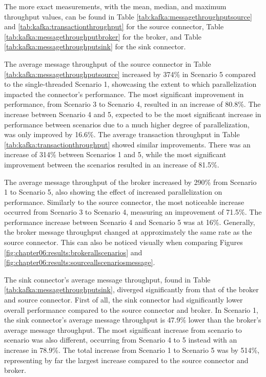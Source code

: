 The more exact measurements, with the mean, median, and maximum throughput values, can be found in Table \ref{tab:kafka:messagethroughputsource} and \ref{tab:kafka:transactionthroughput} for the source connector, Table \ref{tab:kafka:messagethroughputbroker} for the broker, and Table \ref{tab:kafka:messagethroughputsink} for the sink connector.

The average message throughput of the source connector in Table \ref{tab:kafka:messagethroughputsource} increased by 374\% in Scenario 5 compared to the single-threaded Scenario 1, showcasing the extent to which parallelization impacted the connector's performance. The most significant improvement in performance, from Scenario 3 to Scenario 4, resulted in an increase of 80.8\%. The increase between Scenario 4 and 5, expected to be the most significant increase in performance between scenarios due to a much higher degree of parallelization, was only improved by 16.6\%. The average transaction throughput in Table \ref{tab:kafka:transactionthroughput} showed similar improvements. There was an increase of 314\% between Scenarios 1 and 5, while the most significant improvement between the scenarios resulted in an increase of 81.5\%.

The average message throughput of the broker increased by 290\% from Scenario 1 to Scenario 5, also showing the effect of increased parallelization on performance. Similarly to the source connector, the most noticeable increase occurred from Scenario 3 to Scenario 4, measuring an improvement of 71.5\%. The performance increase between Scenario 4 and Scenario 5 was at 16\%. Generally, the broker message throughput changed at approximately the same rate as the source connector. This can also be noticed visually when comparing Figures \ref{fig:chapter06:results:brokerallscenarios} and \ref{fig:chapter06:results:sourceallscenariosmessage}.

The sink connector's average message throughput, found in Table \ref{tab:kafka:messagethroughputsink}, diverged significantly from that of the broker and source connector. First of all, the sink connector had significantly lower overall performance compared to the source connector and broker. In Scenario 1, the sink connector's average message throughput is 47.9\% lower than the broker's average message throughput. The most significant increase from scenario to scenario was also different, occurring from Scenario 4 to 5 instead with an increase in 78.9\%. The total increase from Scenario 1 to Scenario 5 was by 514\%, representing by far the largest increase compared to the source connector and broker. 


